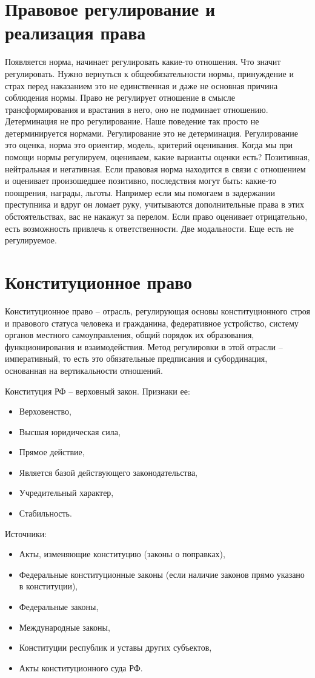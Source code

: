 \documentclass[a4paper, 12pt]{article}
\begin{document}
\section{Правовое регулирование и реализация права}
Появляется норма, начинает регулировать какие-то отношения. Что значит регулировать. Нужно вернуться к общеобязательности нормы, принуждение и страх перед наказанием это не единственная и даже не основная причина соблюдения нормы. Право не регулирует отношение в смысле трансформирования и врастания в него, оно не подминает отношению. Детерминация не про регулирование. Наше поведение так просто не детерминируется нормами. Регулирование это не детерминация. Регулирование это оценка, норма это ориентир, модель, критерий оценивания. Когда мы при помощи нормы регулируем, оцениваем, какие варианты оценки есть? Позитивная, нейтральная и негативная. Если правовая норма находится в связи с отношением и оценивает произошедшее позитивно, последствия могут быть: какие-то поощрения, награды, льготы. Например если мы помогаем в задержании преступника и вдруг он ломает руку, учитываются дополнительные права в этих обстоятельствах, вас не накажут за перелом. Если право оценивает отрицательно, есть возможность привлечь к ответственности. Две модальности. Еще есть не регулируемое. 

\section{Конституционное право}
Конституционное право -- отрасль, регулирующая основы конституционного строя и правового статуса человека и гражданина, федеративное устройство, систему органов местного самоуправления, общий порядок их образования, функционирования и взаимодействия. Метод регулировки в этой отрасли -- императивный, то есть это обязательные предписания и субординация, основанная на вертикальности отношений. 

Конституция РФ -- верховный закон. Признаки ее:
\begin{itemize}
\item Верховенство,
\item Высшая юридическая сила,
\item Прямое действие,
\item Является базой действующего законодательства,
\item Учредительный характер,
\item Стабильность.
\end{itemize}
Источники:
\begin{itemize}
\item Акты, изменяющие конституцию (законы о поправках), 
\item Федеральные конституционные законы (если наличие законов прямо указано в конституции), 
\item Федеральные законы, 
\item Международные законы, 
\item Конституции республик и уставы других субъектов, 
\item Акты конституционного суда РФ. 
\end{itemize}
\end{document}
